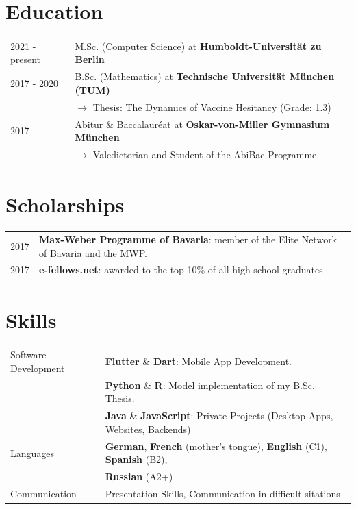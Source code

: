 \documentclass[a4paper,12pt]{article}
\begin{document}
\section{Education}
\begin{tabularx}{\linewidth}{@{}l X@{}}	
2021 - present & M.Sc. (Computer Science) at \textbf{Humboldt-Universität zu Berlin} \hfill \normalsize \\

2017 - 2020 & B.Sc. (Mathematics) at \textbf{Technische Universität München (TUM)}\hfill \\ 
&\phantom{ }$\rightarrow$ Thesis: \href{https://julienandco.github.io/the-dynamics-of-vaccine-hesitancy/bachelor_thesis_julien_caselmann.pdf}{The Dynamics of Vaccine Hesitancy} (Grade: 1.3) \\
2017 & Abitur \& Baccalauréat at \textbf{Oskar-von-Miller Gymnasium München} \hfill \\
&\phantom{ }$\rightarrow$ Valedictorian and Student of the AbiBac Programme
\end{tabularx}

\section{Scholarships}
\begin{tabularx}{\linewidth}{@{}l X@{}}
2017 &  \normalsize{\textbf{Max-Weber Programme of Bavaria}: member of the Elite Network of Bavaria and the MWP.}\\
2017 &  \normalsize{\textbf{e-fellows.net}: awarded to the top 10\% of all high school graduates}\\  
\end{tabularx}

\section{Skills}
\begin{tabularx}{\linewidth}{@{}l X@{}}
Software Development &  \normalsize{\textbf{Flutter} \& \textbf{Dart}: Mobile App Development.}\\
& \normalsize{\textbf{Python} \& \textbf{R}: Model implementation of my B.Sc.\,Thesis.}\\
& \normalsize{\textbf{Java} \& \textbf{JavaScript}: Private Projects (Desktop Apps, Websites, Backends)}\\
Languages &  \normalsize{\textbf{German}, \textbf{French} (mother's tongue), \textbf{English} (C1), \textbf{Spanish} (B2),}\\  
& \normalsize{\textbf{Russian} (A2+)}\\
Communication &  \normalsize{Presentation Skills, Communication in difficult sitations }\\  
\end{tabularx}

\vfill
{}
\end{document}
